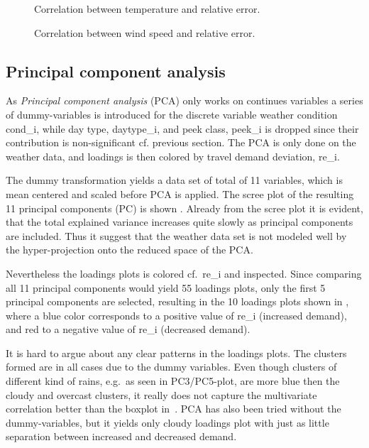 \begin{figure}[!ht]
    \center
    
    \vspace{-1em}
    \caption{Correlation between temperature and relative error.}
    \label{fig:cor_temp}
\end{figure}

\begin{figure}[!ht]
    \center
    
    \caption{Correlation between wind speed and relative error.}
    \label{fig:cor_ws}
\end{figure}

\subsection{Principal component analysis}
As  \emph{Principal component analysis} (PCA) only works on continues variables a series of dummy-variables is introduced for the discrete variable weather condition \gls{cond_i}, while day type, \gls{daytype_i}, and peek class, \gls{peek_i} is dropped since their contribution is non-significant cf. previous section. The PCA is only done on the weather data, and loadings is then colored by travel demand deviation, \gls{re_i}.

The dummy transformation yields a data set of total of 11 variables, which is mean centered and scaled before PCA is applied. The scree plot of the resulting 11 principal components (PC) is shown . Already from the scree plot it is evident, that the total explained variance increases quite slowly as principal components are included. Thus it suggest that the weather data set is not modeled well by the hyper-projection onto the reduced space of the PCA.

Nevertheless the loadings plots is colored cf.\ \gls{re_i} and inspected. Since comparing all 11 principal components would yield 55 loadings plots, only the first 5 principal components are selected, resulting in the 10 loadings plots shown in , where a blue color corresponds to a positive value of \gls{re_i} (increased demand), and red to a negative value of \gls{re_i} (decreased demand).

It is hard to argue about any clear patterns in the loadings plots. The clusters formed are in all cases due to the dummy variables. Even though clusters of different kind of rains, e.g.\ as seen in PC3/PC5-plot, are more blue then the cloudy and overcast clusters, it really does not capture the multivariate correlation better than the boxplot in~. PCA has also been tried without the dummy-variables, but it yields only cloudy loadings plot with just as little separation between increased and decreased demand.

